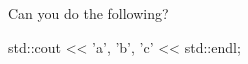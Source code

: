 Can you do the following?

\begin{consolethree}[escapeinside=||]

std::cout << {'a', 'b', 'c'} << std::endl;

\end{consolethree}

